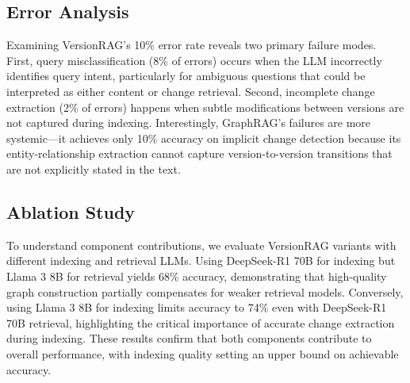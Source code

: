 \subsection{Error Analysis}

Examining VersionRAG's 10\% error rate reveals two primary failure modes. First, query misclassification (8\% of errors) occurs when the LLM incorrectly identifies query intent, particularly for ambiguous questions that could be interpreted as either content or change retrieval. Second, incomplete change extraction (2\% of errors) happens when subtle modifications between versions are not captured during indexing. Interestingly, GraphRAG's failures are more systemic—it achieves only 10\% accuracy on implicit change detection because its entity-relationship extraction cannot capture version-to-version transitions that are not explicitly stated in the text.

\subsection{Ablation Study}

To understand component contributions, we evaluate VersionRAG variants with different indexing and retrieval LLMs. Using DeepSeek-R1 70B for indexing but Llama 3 8B for retrieval yields 68\% accuracy, demonstrating that high-quality graph construction partially compensates for weaker retrieval models. Conversely, using Llama 3 8B for indexing limits accuracy to 74\% even with DeepSeek-R1 70B retrieval, highlighting the critical importance of accurate change extraction during indexing. These results confirm that both components contribute to overall performance, with indexing quality setting an upper bound on achievable accuracy.
